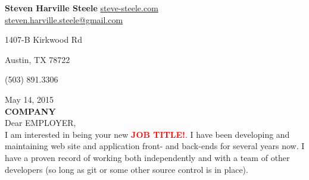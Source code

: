 \documentclass[11pt]{ncsuthesis4}
\begin{document}
\oddsidemargin 0.25in
\evensidemargin 0.25in
\textwidth 6.0in
\topmargin 0.25in
\textheight 8.0in
\renewcommand{\baselinestretch}{2}
\renewcommand{\headrulewidth}{0pt}
\thispagestyle{empty}
\rhead{\thepage}
\setlength{\headsep}{0in}
\setlength{\parindent}{2em}




\noindent \textbf{\Large Steven Harville Steele} \hfill \textcolor{blue}{\href{http://www.steve-steele.com}{steve-steele.com}}
\\

\hfill \href{mailto:steven.harville.steele@gmail.com}{steven.harville.steele@gmail.com}

\hfill 1407-B Kirkwood Rd

\hfill Austin, TX  78722

\hfill (503) 891.3306

\noindent May 14, 2015\\%

\noindent \textbf{COMPANY}\\%

\noindent Dear EMPLOYER,
\\

\noindent
I am interested in being your new \textcolor{red}{\textbf{JOB TITLE!}}. I have been developing and maintaining web site and application front- and back-ends for several years now. I have a proven record of working both independently and with a team of other developers (so long as git or some other source control is in place).
\\
\end{document}

